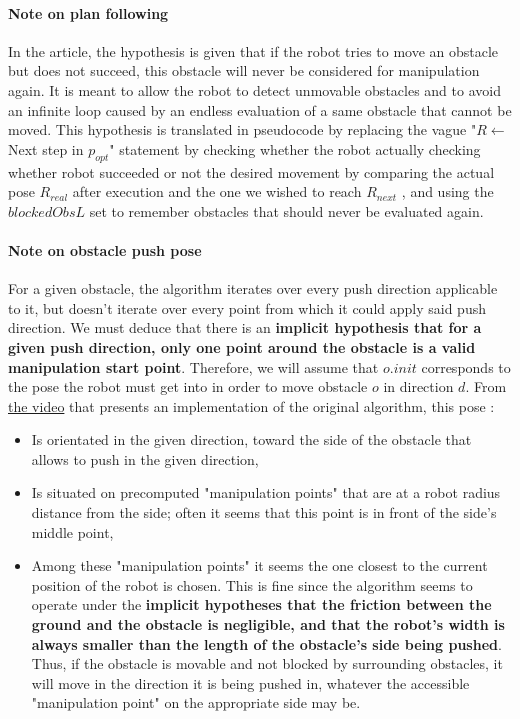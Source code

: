 \paragraph{Note on plan following}\label{plan_following_note} In the article, the hypothesis is given that if the robot tries to move an obstacle but does not succeed, this obstacle will never be considered for manipulation again. It is meant to allow the robot to detect unmovable obstacles and to avoid an infinite loop caused by an endless evaluation of a same obstacle that cannot be moved. This hypothesis is translated in pseudocode by replacing the vague "$R \gets$ Next step in $p_{opt}$" statement by checking whether the robot actually checking whether robot succeeded or not the desired movement by comparing the actual pose $R_{real}$ after execution and the one we wished to reach $R_{next}$ , and using the $blockedObsL$ set to remember obstacles that should never be evaluated again.

\paragraph{Note on obstacle push pose}\label{obstacle_pushpose_note} For a given obstacle, the algorithm iterates over every push direction applicable to it, but doesn't iterate over every point from which it could apply said push direction. We must deduce that there is an \textbf{implicit hypothesis that for a given push direction, only one point around the obstacle is a valid manipulation start point}. Therefore, we will assume that $o.init$ corresponds to the pose the robot must get into in order to move obstacle $o$ in direction $d$. From \href{https://youtu.be/oQZLbJHYrl8}{the video} that presents an implementation of the original algorithm, this pose :

\begin{itemize}
  \item Is orientated in the given direction, toward the side of the obstacle that allows to push in the given direction,
  \item Is situated on precomputed "manipulation points" that are at a robot radius distance from the side; often it seems that this point is in front of the side's middle point,
  \item Among these "manipulation points" it seems the one closest to the current position of the robot is chosen. This is fine since the algorithm seems to operate under the \textbf{implicit hypotheses that the friction between the ground and the obstacle is negligible, and that the robot's width is always smaller than the length of the obstacle's side being pushed}. Thus, if the obstacle is movable and not blocked by surrounding obstacles, it will move in the direction it is being pushed in, whatever the accessible "manipulation point" on the appropriate side may be.
\end{itemize}

